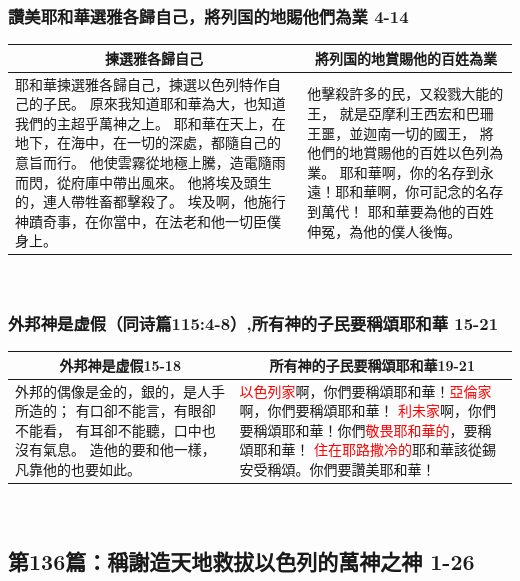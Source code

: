 \subsubsection{讚美耶和華選雅各歸自己，將列国的地賜他們為業 4-14}
\begin{table}[H]
\centering
\begin{tabular}{p{10.25cm}|p{7.50cm}}\hline\hline
\multicolumn{1}{c|}{揀選雅各歸自己}&\multicolumn{1}{c}{將列国的地賞賜他的百姓為業}\\\hline
耶和華揀選雅各歸自己，揀選以色列特作自己的子民。
原來我知道耶和華為大，也知道我們的主超乎萬神之上。
耶和華在天上，在地下，在海中，在一切的深處，都隨自己的意旨而行。
他使雲霧從地極上騰，造電隨雨而閃，從府庫中帶出風來。
他將埃及頭生的，連人帶牲畜都擊殺了。
埃及啊，他施行神蹟奇事，在你當中，在法老和他一切臣僕身上。
&他擊殺許多的民，又殺戮大能的王，
就是亞摩利王西宏和巴珊王噩，並迦南一切的國王，
將他們的地賞賜他的百姓以色列為業。
耶和華啊，你的名存到永遠！耶和華啊，你可記念的名存到萬代！
耶和華要為他的百姓伸冤，為他的僕人後悔。\\\hline
\end{tabular}
\end{table} 

\subsubsection{外邦神是虚假（同诗篇115:4-8）,所有神的子民要稱頌耶和華 15-21}
\begin{table}[H]
\centering
\begin{tabular}{p{7.75cm}|p{9.900cm}}\hline\hline
\multicolumn{1}{c|}{外邦神是虚假15-18}&\multicolumn{1}{c}{所有神的子民要稱頌耶和華19-21}\\\hline
外邦的偶像是金的，銀的，是人手所造的；
有口卻不能言，有眼卻不能看，
有耳卻不能聽，口中也沒有氣息。
造他的要和他一樣，凡靠他的也要如此。
&\textcolor{red}{以色列家}啊，你們要稱頌耶和華！\textcolor{red}{亞倫家}啊，你們要稱頌耶和華！
\textcolor{red}{利未家}啊，你們要稱頌耶和華！你們\textcolor{red}{敬畏耶和華的}，要稱頌耶和華！
\textcolor{red}{住在耶路撒冷的}耶和華該從錫安受稱頌。你們要讚美耶和華！\\\hline
\end{tabular}
\end{table} 


\subsection{第136篇：稱謝造天地救拔以色列的萬神之神 1-26}
